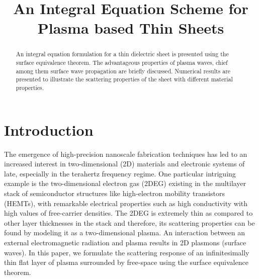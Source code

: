 \documentclass[conference, 10pt]{IEEEtran}
\renewcommand{\^}{\hat}  %
\begin{document}
\title{An Integral Equation Scheme for Plasma based Thin Sheets}


\author{
\and
{}
}


%
\begin{abstract}
  An integral equation formulation for a thin dielectric sheet is presented using the surface equivalence theorem. The advantageous properties of plasma waves, chief among them surface wave propagation are briefly discussed. Numerical results are presented to illustrate the scattering properties of the sheet with different material properties.
\end{abstract}

\IEEEpeerreviewmaketitle
\section{Introduction}

The emergence of high-precision nanoscale fabrication techniques has led to an increased interest in two-dimensional (2D) materials and electronic systems of late, especially in the terahertz frequency regime. One particular intriguing example is the two-dimensional electron gas (2DEG) existing in the multilayer stack of semiconductor structures like high-electron mobility transistors (HEMTs), with remarkable electrical properties such as high conductivity with high values of free-carrier densities. The 2DEG is extremely thin as compared to other layer thicknesses in the stack and therefore, its scattering properties can be found by modeling it as a two-dimensional plasma. An interaction between an external electromagnetic radiation and plasma results in 2D plasmons (surface waves). In this paper, we formulate the scattering response of an infinitesimally thin flat layer of plasma surrounded by free-space using the surface equivalence theorem.
\end{document}
